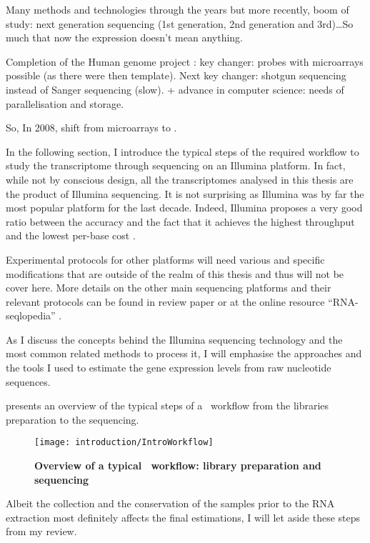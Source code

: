 Many methods and technologies through the years but more recently, boom of study:
next generation sequencing (1st generation, 2nd generation and 3rd)\ldots So
much that now the expression doesn't mean anything.

Completion of the Human genome project : key changer: probes with microarrays
possible (as there were then template). Next key changer: shotgun sequencing
instead of Sanger sequencing (slow). + advance in computer science: needs of
parallelisation and storage.

So, In 2008, shift from microarrays to \Rnaseq.

\clearpage

In the following section, I introduce the typical steps of the required workflow
to study the transcriptome through sequencing on an Illumina platform. In fact,
while not by conscious design, all the transcriptomes analysed in this thesis are
the product of Illumina sequencing. It is not surprising as Illumina was by far
the most popular platform for the last decade. Indeed, Illumina proposes a very
good ratio between the accuracy and the fact that it achieves the highest
throughput and the lowest per-base cost .

Experimental protocols for other platforms will need various and specific
modifications that are outside of the realm of this thesis and thus will not be
cover here. More details on the other main sequencing platforms and their
relevant protocols can be found in \cite{rnaseqProtocols} review paper or at the
online resource ``RNA-seqlopedia'' .

As I discuss the concepts behind the Illumina sequencing technology and the
most common related methods to process it, I will emphasise the approaches and
the tools I used to estimate the gene expression levels from raw nucleotide
sequences.

 presents an overview of the typical steps of a
\Rnaseq\ workflow from the libraries preparation to the sequencing.

\begin{figure}
    \texttt{[image: introduction/IntroWorkflow]}\centering
    \caption[Overview of a \Rnaseq\ workflow: library preparation
    and sequencing]{\label{fig:OverviewRnaseqPrepSeq}\textbf{Overview of
    a typical \Rnaseq\ workflow:
    library preparation and sequencing}}
\end{figure}

\NB Albeit the collection and the conservation of the samples prior to the
\gls{RNA} extraction most definitely affects the final estimations,
I will let aside these steps from my review.


